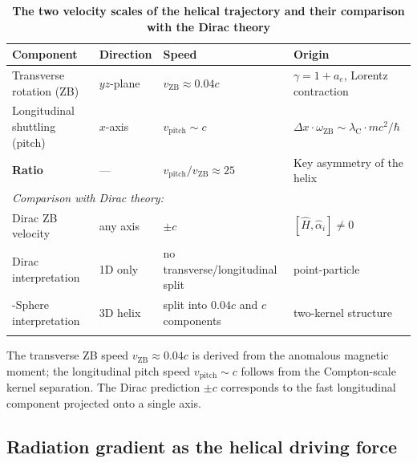 \documentclass[%
 reprint, amsmath,amssymb, aps, prb, ]{revtex4-2}
\numberwithin{equation}{section}
\newcommand{\omZB}{\omega_{\text{ZB}}}
\newcommand{\lambdaC}{\lambda_{\mathrm{C}}}
\begin{document}
\begin{table}[t!]
\centering
\caption{\textbf{The two velocity scales of the helical trajectory and their comparison with the Dirac theory}}
\label{tab:velocity_scales}
\renewcommand{\arraystretch}{1.4}
\begin{tabular}{p{5.0cm}p{2.0cm}p{5.2cm}p{4.8cm}}
\toprule
\textbf{Component} & \textbf{Direction} & \textbf{Speed} & \textbf{Origin} \\
\midrule
Transverse rotation (ZB)
& $yz$-plane
& $v_{\mathrm{ZB}} \approx 0.04c$
& $\gamma = 1 + a_e$, Lorentz contraction \cite{hanamura10} \\
\addlinespace[0.3cm]
Longitudinal shuttling (pitch)
& $x$-axis
& $v_{\mathrm{pitch}} \sim c$
& $\Delta x \cdot \omZB \sim \lambdaC \cdot mc^2/\hbar$ \\
\addlinespace[0.3cm]
\textbf{Ratio}
& ---
& $v_{\mathrm{pitch}}/v_{\mathrm{ZB}} \approx 25$
& Key asymmetry of the helix \\
\midrule
\multicolumn{4}{l}{\textit{Comparison with Dirac theory:}} \\
\addlinespace[0.3cm]
Dirac ZB velocity
& any axis
& $\pm c$
& $[\hat{H}, \hat{\alpha}_i] \neq 0$ \\
\addlinespace[0.3cm]
Dirac interpretation
& 1D only
& no transverse/longitudinal split
& point-particle \\
\addlinespace[0.3cm]
0-Sphere interpretation
& 3D helix
& split into $0.04c$ and $c$ components
& two-kernel structure \\
\addlinespace[0.2cm]
\bottomrule
\end{tabular}
\vspace{0.2cm}
\begin{minipage}{0.95\textwidth}
\justifying\footnotesize
The transverse ZB speed $v_{\mathrm{ZB}} \approx 0.04c$ is derived from the anomalous magnetic moment; the longitudinal pitch speed $v_{\mathrm{pitch}} \sim c$ follows from the Compton-scale kernel separation. The Dirac prediction $\pm c$ corresponds to the fast longitudinal component projected onto a single axis.
\end{minipage}
\end{table}

\subsection{Radiation gradient as the helical driving force}
\label{subsec:gradient_drive}
\end{document}
